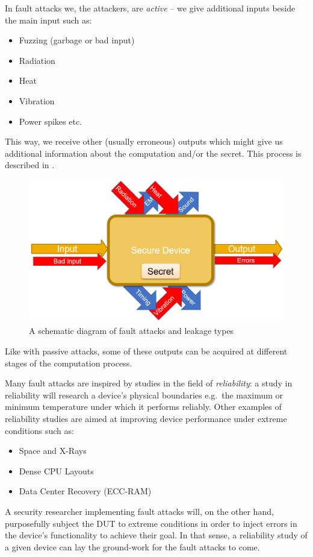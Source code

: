 In fault attacks we, the attackers, are \emph{active} -- we give additional inputs beside
the main input such as:
\begin{itemize}
	\item Fuzzing (garbage or bad input)
	\item Radiation
	\item Heat
	\item Vibration
	\item Power spikes etc.
\end{itemize}

This way, we receive other (usually erroneous) outputs which might give us
additional information about the computation and/or the secret. This process is
described in .

\begin{figure}[!ht]
	\centering
	\includegraphics[width=0.7\linewidth]{images/chapter_9/fault_attacks_schematic.png}
	\caption{A schematic diagram of fault attacks and leakage types}\label{fig:fault_attacks_schematic}
\end{figure}

Like with passive attacks, some of these outputs can be acquired at different
stages of the computation process.

Many fault attacks are inspired by studies in the field of \emph{reliability}: a
study in reliability will research a device's physical boundaries e.g.\ the
maximum or minimum temperature under which it performs reliably. Other examples
of reliability studies are aimed at improving device performance under extreme
conditions such as:
\begin{itemize}
	\item Space and X-Rays
	\item Dense CPU Layouts
	\item Data Center Recovery (ECC-RAM)
\end{itemize}

A security researcher implementing fault attacks will, on the other hand,
purposefully subject the DUT to extreme conditions in order to inject errors in
the device's functionality to achieve their goal. In that sense, a reliability
study of a given device can lay the ground-work for the fault attacks to come.

